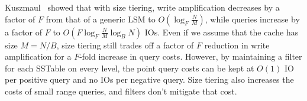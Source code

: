 Kuszmaul~\cite{bradleywhitepaper} 
showed that with size tiering, write amplification decreases by a factor
of $F$ from that of a generic LSM to $O(\log_F
\frac{N}{M})$, while queries increase by a factor of $F$ to
$O(F \log_F \frac{N}{M} \log_B N)$ IOs.  Even if we assume
that the cache has size $M=N/B$, size tiering still trades off a
factor of $F$ reduction in write amplification for a
$F$-fold increase in query costs.  However, by maintaining a
filter for each SSTable on every level, the point query costs can be
kept at $O(1)$ IO per positive query and no IOs per negative query.
Size tiering also increases the costs of small range queries, and
filters don't mitigate that cost.






